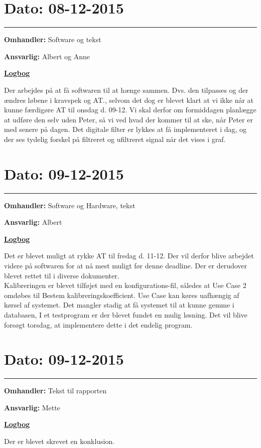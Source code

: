 \section{Dato: 08-12-2015}
\hrule
\textbf{Omhandler:} Software og tekst

\textbf{Ansvarlig:} Albert og Anne

\underline{\textbf{Logbog}}

Der arbejdes på at få softwaren til at hænge sammen. Dvs. den tilpasses og der ændres løbene i kravspek og AT., selvom det dog er blevet klart at vi ikke når at kunne færdigøre AT til onsdag d. 09-12. Vi skal derfor om formiddagen planlægge at udføre den selv uden Peter, så vi ved hvad der kommer til at ske, når Peter er med senere på dagen.
Det digitale filter er lykkes at få implementeret i dag, og der ses tydelig forskel på filtreret og ufiltreret signal når det vises i graf.  
\\

\section{Dato: 09-12-2015}
\hrule
\textbf{Omhandler:} Software og Hardware, tekst

\textbf{Ansvarlig:} Albert 

\underline{\textbf{Logbog}}

Det er blevet muligt at rykke AT til fredag d. 11-12. Der vil derfor blive arbejdet videre på softwaren for at nå mest muligt før denne deadline. Der er derudover blevet rettet til i diverse dokumenter. \\
Kalibreringen er blevet tilføjet med en konfigurations-fil, således at Use Case 2 omdøbes til Bestem kalibreringskoefficient. Use Case kan køres uafhængig af kørsel af systemet. Det mangler stadig at få systemet til at kunne gemme i databasen, I et testprogram er der blevet fundet en mulig løsning. Det vil blive forsøgt torsdag, at implementere dette i det endelig program.
\\

\section{Dato: 09-12-2015}
\hrule
\textbf{Omhandler:} Tekst til rapporten 

\textbf{Ansvarlig:} Mette 

\underline{\textbf{Logbog}}

Der er blevet skrevet en konklusion. 
\\

